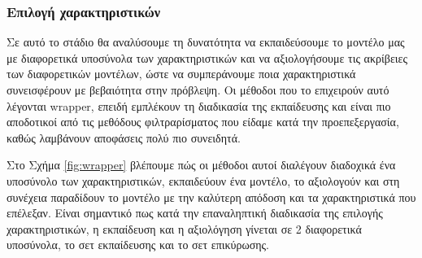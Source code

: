 \subsubsection{Επιλογή χαρακτηριστικών} \label{section:selection}
Σε αυτό το στάδιο θα αναλύσουμε τη δυνατότητα να εκπαιδεύσουμε το μοντέλο μας με διαφορετικά υποσύνολα των χαρακτηριστικών και να αξιολογήσουμε τις ακρίβειες των διαφορετικών μοντέλων, ώστε να συμπεράνουμε ποια χαρακτηριστικά συνεισφέρουν με βεβαιότητα στην πρόβλεψη. Οι μέθοδοι που το επιχειρούν αυτό λέγονται wrapper, επειδή εμπλέκουν  τη διαδικασία της εκπαίδευσης και είναι πιο αποδοτικοί από τις μεθόδους φιλτραρίσματος που είδαμε κατά την προεπεξεργασία, καθώς λαμβάνουν αποφάσεις πολύ πιο συνειδητά.

Στο Σχήμα \ref{fig:wrapper} βλέπουμε πώς οι μέθοδοι αυτοί διαλέγουν διαδοχικά ένα υποσύνολο των χαρακτηριστικών, εκπαιδεύουν ένα μοντέλο, το αξιολογούν και στη συνέχεια παραδίδουν το μοντέλο με την καλύτερη απόδοση και τα χαρακτηριστικά που επέλεξαν. Είναι σημαντικό πως κατά την επαναληπτική διαδικασία της επιλογής χαρακτηριστικών, η εκπαίδευση και η αξιολόγηση γίνεται σε 2 διαφορετικά υποσύνολα, το σετ εκπαίδευσης και το σετ επικύρωσης.

